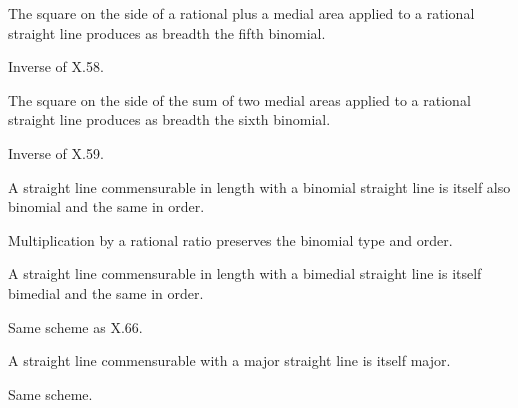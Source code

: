 \documentclass{rrxiv}
\begin{document}
\begin{claim}
\label{prop:X.64}
The square on the side of a rational plus a medial area applied to
a rational straight line produces as breadth the fifth binomial.
\end{claim}
\begin{evidence}[Proof of X.64]
\label{ev:X.64}
Inverse of X.58.
\end{evidence}

\begin{claim}
\label{prop:X.65}
The square on the side of the sum of two medial areas applied to a
rational straight line produces as breadth the sixth binomial.
\end{claim}
\begin{evidence}[Proof of X.65]
\label{ev:X.65}
Inverse of X.59.
\end{evidence}

\begin{claim}
\label{prop:X.66}
A straight line commensurable in length with a binomial straight
line is itself also binomial and the same in order.
\end{claim}
\begin{evidence}[Proof of X.66]
\label{ev:X.66}
Multiplication by a rational ratio preserves the binomial type and
order.
\end{evidence}

\begin{claim}
\label{prop:X.67}
A straight line commensurable in length with a bimedial straight
line is itself bimedial and the same in order.
\end{claim}
\begin{evidence}[Proof of X.67]
\label{ev:X.67}
Same scheme as X.66.
\end{evidence}

\begin{claim}
\label{prop:X.68}
A straight line commensurable with a major straight line is itself
major.
\end{claim}
\begin{evidence}[Proof of X.68]
\label{ev:X.68}
Same scheme.
\end{evidence}
\end{document}
